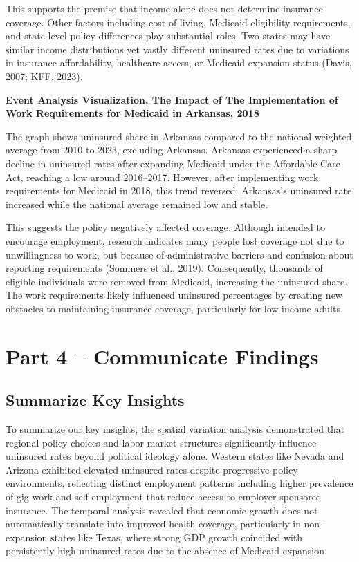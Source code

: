 \documentclass[
]{article}
\begin{document}
This supports the premise that income alone does not determine insurance
coverage. Other factors including cost of living, Medicaid eligibility
requirements, and state-level policy differences play substantial roles.
Two states may have similar income distributions yet vastly different
uninsured rates due to variations in insurance affordability, healthcare
access, or Medicaid expansion status (Davis, 2007; KFF, 2023).

\textbf{Event Analysis Visualization, The Impact of The Implementation
of Work Requirements for Medicaid in Arkansas, 2018}

The graph shows uninsured share in Arkansas compared to the national
weighted average from 2010 to 2023, excluding Arkansas. Arkansas
experienced a sharp decline in uninsured rates after expanding Medicaid
under the Affordable Care Act, reaching a low around 2016--2017.
However, after implementing work requirements for Medicaid in 2018, this
trend reversed: Arkansas's uninsured rate increased while the national
average remained low and stable.

This suggests the policy negatively affected coverage. Although intended
to encourage employment, research indicates many people lost coverage
not due to unwillingness to work, but because of administrative barriers
and confusion about reporting requirements (Sommers et al., 2019).
Consequently, thousands of eligible individuals were removed from
Medicaid, increasing the uninsured share. The work requirements likely
influenced uninsured percentages by creating new obstacles to
maintaining insurance coverage, particularly for low-income adults.

\section{Part 4 -- Communicate
Findings}\label{part-4-communicate-findings}

\subsection{Summarize Key Insights}\label{summarize-key-insights}

To summarize our key insights, the spatial variation analysis
demonstrated that regional policy choices and labor market structures
significantly influence uninsured rates beyond political ideology alone.
Western states like Nevada and Arizona exhibited elevated uninsured
rates despite progressive policy environments, reflecting distinct
employment patterns including higher prevalence of gig work and
self-employment that reduce access to employer-sponsored insurance. The
temporal analysis revealed that economic growth does not automatically
translate into improved health coverage, particularly in non-expansion
states like Texas, where strong GDP growth coincided with persistently
high uninsured rates due to the absence of Medicaid expansion.
\end{document}
